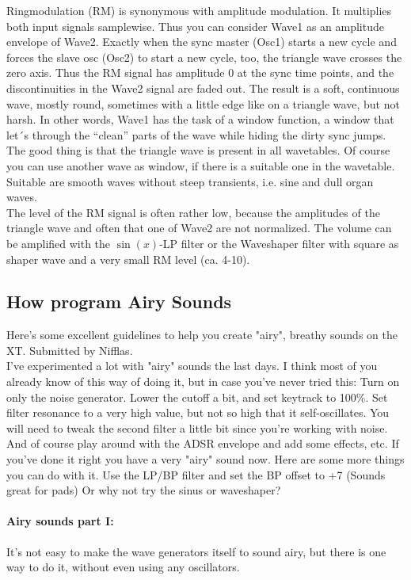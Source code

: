 Ringmodulation (RM) is synonymous  with amplitude modulation. It multiplies both input signals samplewise. Thus you can consider Wave1 as an amplitude envelope of Wave2. Exactly when the sync master (Osc1) starts a new cycle and forces the slave osc (Osc2) to start a new cycle, too, the triangle wave crosses the zero axis. Thus the RM signal has amplitude 0 at the sync time points, and the discontinuities in the Wave2 signal are faded out. The result is a soft, continuous wave, mostly round, sometimes with a little edge like on a triangle wave, but not harsh. In other words, Wave1 has the task of a window function, a window that let´s through the “clean” parts of the wave while hiding the dirty sync jumps.\\
The good thing is that the triangle wave is present in all wavetables. Of course you can use another wave as window, if there is a suitable one in the wavetable. Suitable are smooth waves without steep transients, i.e. sine and dull organ waves.\\
The level of the RM signal is often rather low, because the amplitudes of the triangle wave and often that one of Wave2 are not normalized. The volume can be amplified with the $\sin(x)$-LP filter or the Waveshaper filter with square as shaper wave and a very small RM level (ca. 4-10).
\subsection{How program Airy Sounds}
Here's some excellent guidelines to help you create "airy", breathy sounds on the XT. Submitted by Nifflas.\\
I've experimented a lot with "airy" sounds the last days. I think most of you already know of this way of doing it, but in case you've never tried this:
Turn on only the noise generator. Lower the cutoff a bit, and set keytrack to 100\%. Set filter resonance to a very high value, but not so high that it self-oscillates. You will need to tweak the second filter a little bit since you're working with noise.
And of course play around with the ADSR envelope and add some effects, etc.
If you've done it right you have a very "airy" sound now. Here are some more things you can do with it.
Use the LP/BP filter and set the BP offset to +7 (Sounds great for pads) Or why not try the sinus or waveshaper?
\paragraph{Airy sounds part I:}
It's not easy to make the wave generators itself to sound airy, but there is one way to do it, without even using any oscillators.

